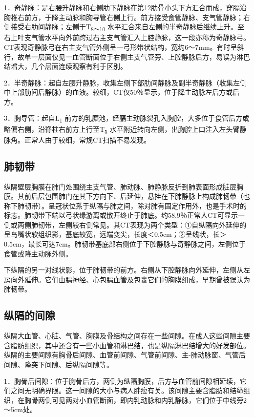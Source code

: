 1．奇静脉：是右腰升静脉和右侧肋下静脉在第12肋骨小头下方汇合而成，穿膈沿胸椎右前方，于降主动脉和胸导管右侧上行。前方接受食管静脉、支气管静脉；右侧接受右肋间静脉；左侧于T\textsubscript{8～10}
水平汇合来自左侧的半奇静脉后继续上升。至右上叶支气管水平向外前跨过右主支气管汇入上腔静脉，这一段亦称为奇静脉弓。CT表现奇静脉弓在右主支气管外侧呈一弓形带状结构，宽约6～7mm。有时呈斜行，故单一层面仅见一血管断面位于右侧主支气管旁、上腔静脉后方，易误为淋巴结增大，几个层面连续观察有利于区别。

2．半奇静脉：起自左腰升静脉，收集左侧下部肋间静脉及副半奇静脉（收集左侧中上部肋间后静脉）的血液。较细，CT仅50％显示，位于降主动脉左后方或后方。

3．胸导管：起自L\textsubscript{1}
前方的乳糜池，经膈主动脉裂孔入胸腔，大多位于食管后方或略偏右侧，沿脊柱右前方上行至T\textsubscript{5}
水平附近转向左侧，出胸腔上口注入左头臂静脉角。正常人由于较细，常规CT扫描不易发现。

\subsection{肺韧带}

纵隔壁层胸膜在肺门处围绕主支气管、肺动脉、肺静脉反折到肺表面形成脏层胸膜。其前后层包围肺门在其下方向下、后延伸，悬挂在下肺静脉上构成肺韧带（也称下肺韧带）。呈冠状位系于纵隔与肺之间，除对肺有固定作用外，也是手术时的标志。肺韧带下端以弓状缘游离或散开终止于肺底。约58.9％正常人CT可显示一侧或两侧肺韧带，左侧较右侧常见。其CT表现为两个类型：①自纵隔向外延伸的呈鸟嘴状软组织影，基底较宽，远端变尖，长度＜0.5cm；②呈线状，长＞0.5cm，最长可达7cm。肺韧带基底部右侧位于下腔静脉与奇静脉之间，左侧位于食管或降主动脉外侧。

下纵隔的另一对线状影，位于肺韧带的前方。右侧从下腔静脉向外延伸，左侧从左房向外延伸。它们由膈神经、心包膈血管及包裹它们的胸膜组成，早期曾被误认为肺韧带。

\subsection{纵隔的间隙}

纵隔大血管、心脏、气管、胸膜及骨结构之间存在一些间隙。在成人这些间隙主要含脂肪组织，其中还含有一些小血管和淋巴结，也是纵隔淋巴结增大的好发部位。纵隔的主要间隙有胸骨后间隙、血管前间隙、气管前间隙、主-肺动脉窗、气管后间隙、隆突下间隙、后纵隔间隙等。

1．胸骨后间隙：位于胸骨后方，两侧为纵隔胸膜，后方与血管前间隙相延续，它们之间无明确界限。这一间隙的大小与病人胖瘦有关。该间隙主要含脂肪和结缔组织，在胸骨两侧可见两对小血管断面，即内乳动脉和内乳静脉，它们位于中线旁2～5cm处。

